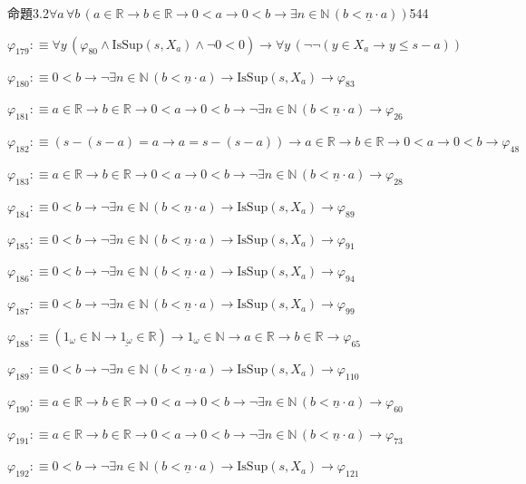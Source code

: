 \begin{fullproof}{命題3.2}{$\forall a\,\forall b\,(a \in \mathbb{R} \to b \in \mathbb{R} \to 0 < a \to 0 < b \to \exists n \in \mathbb{N}\,(b < \underline{n} \cdot a))$}{544}
\begin{abbrevlist}
\item $\varphi_{179} :\equiv \forall y\,(\varphi_{80} \land \mathrm{IsSup}(s,X_{a}) \land \neg 0 < 0) \to \forall y\,(\neg \neg (y \in X_{a} \to y \leq s - a))$
\item $\varphi_{180} :\equiv 0 < b \to \neg \exists n \in \mathbb{N}\,(b < \underline{n} \cdot a) \to \mathrm{IsSup}(s,X_{a}) \to \varphi_{83}$
\item $\varphi_{181} :\equiv a \in \mathbb{R} \to b \in \mathbb{R} \to 0 < a \to 0 < b \to \neg \exists n \in \mathbb{N}\,(b < \underline{n} \cdot a) \to \varphi_{26}$
\item $\varphi_{182} :\equiv (s - (s - a) = a \to a = s - (s - a)) \to a \in \mathbb{R} \to b \in \mathbb{R} \to 0 < a \to 0 < b \to \varphi_{48}$
\item $\varphi_{183} :\equiv a \in \mathbb{R} \to b \in \mathbb{R} \to 0 < a \to 0 < b \to \neg \exists n \in \mathbb{N}\,(b < \underline{n} \cdot a) \to \varphi_{28}$
\item $\varphi_{184} :\equiv 0 < b \to \neg \exists n \in \mathbb{N}\,(b < \underline{n} \cdot a) \to \mathrm{IsSup}(s,X_{a}) \to \varphi_{89}$
\item $\varphi_{185} :\equiv 0 < b \to \neg \exists n \in \mathbb{N}\,(b < \underline{n} \cdot a) \to \mathrm{IsSup}(s,X_{a}) \to \varphi_{91}$
\item $\varphi_{186} :\equiv 0 < b \to \neg \exists n \in \mathbb{N}\,(b < \underline{n} \cdot a) \to \mathrm{IsSup}(s,X_{a}) \to \varphi_{94}$
\item $\varphi_{187} :\equiv 0 < b \to \neg \exists n \in \mathbb{N}\,(b < \underline{n} \cdot a) \to \mathrm{IsSup}(s,X_{a}) \to \varphi_{99}$
\item $\varphi_{188} :\equiv (1_{\omega} \in \mathbb{N} \to \underline{1_{\omega}} \in \mathbb{R}) \to 1_{\omega} \in \mathbb{N} \to a \in \mathbb{R} \to b \in \mathbb{R} \to \varphi_{65}$
\item $\varphi_{189} :\equiv 0 < b \to \neg \exists n \in \mathbb{N}\,(b < \underline{n} \cdot a) \to \mathrm{IsSup}(s,X_{a}) \to \varphi_{110}$
\item $\varphi_{190} :\equiv a \in \mathbb{R} \to b \in \mathbb{R} \to 0 < a \to 0 < b \to \neg \exists n \in \mathbb{N}\,(b < \underline{n} \cdot a) \to \varphi_{60}$
\item $\varphi_{191} :\equiv a \in \mathbb{R} \to b \in \mathbb{R} \to 0 < a \to 0 < b \to \neg \exists n \in \mathbb{N}\,(b < \underline{n} \cdot a) \to \varphi_{73}$
\item $\varphi_{192} :\equiv 0 < b \to \neg \exists n \in \mathbb{N}\,(b < \underline{n} \cdot a) \to \mathrm{IsSup}(s,X_{a}) \to \varphi_{121}$

\end{abbrevlist}
\end{fullproof}
